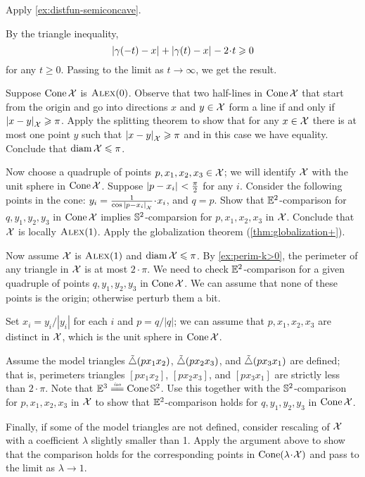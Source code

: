  Apply \ref{ex:distfun-semiconcave}.

 By the triangle inequality, 
\[\dist{\gamma(-t)}{x}{}+\dist{\gamma(t)}{x}{}-2\cdot t\ge 0\]
for any $t\ge 0$.
Passing to the limit as $t\to\infty$, we get the result.

Suppose $\mathop{\rm Cone}\nolimits\mathcal{X}$ is $\textsc{Alex}(0)$.
Observe that two half-lines in $\mathop{\rm Cone}\nolimits\mathcal{X}$ that start from the origin and go into directions $x$ and $y\in\mathcal{X}$ form a line if and only if $|{x}-{y}|_{\mathcal{X}}^{{}}\geqslant \pi$.
Apply the splitting theorem to show that for any $x\in \mathcal{X}$ there is at most one point $y$ such that $|{x}-{y}|_{\mathcal{X}}^{{}}\geqslant \pi$ and in this case we have equality.
Conclude that $\operatorname{\rm diam}\nolimits \mathcal{X}\leqslant \pi$.

Now choose a quadruple of points $p,x_1,x_2,x_3\in \mathcal{X}$;
we will identify $\mathcal{X}$ with the unit sphere in $\mathop{\rm Cone}\nolimits\mathcal{X}$.
Suppose $|{p}-{x_i}|_{}^{{}}<\tfrac\pi2$ for any $i$.
Consider the following points in the cone: $y_i=\tfrac1{\cos \dist{p}{x_i}{\spc{X}}}\cdot x_i$, and $q=p$.
Show that $\mathbb{E}^2$-comparison for $q,y_1,y_2,y_3$ in $\mathop{\rm Cone}\nolimits\mathcal{X}$ implies $\mathbb{S}^2$-comparsion for $p,x_1,x_2,x_3$ in $\mathcal{X}$.
Conclude that $\mathcal{X}$ is locally $\textsc{Alex}(1)$. 
Apply the globalization theorem (\ref{thm:globalization+}).

Now assume $\mathcal{X}$ is $\textsc{Alex}(1)$ and $\operatorname{\rm diam}\nolimits\mathcal{X}\leqslant \pi$.
By \ref{ex:perim-k>0}, the perimeter of any triangle in $\mathcal{X}$ is at most $2\cdot\pi$.
We need to check $\mathbb{E}^2$-comparison for a given quadruple of points $q,y_1,y_2,y_3$ in $\mathop{\rm Cone}\nolimits\mathcal{X}$.
We can assume that none of these points is the origin; otherwise perturb them a bit.

Set $x_i=y_i/|y_i|$ for each $i$ and $p=q/|q|$; we can assume that $p,x_1,x_2,x_3$ are distinct in $\mathcal{X}$, which is the unit sphere in $\mathop{\rm Cone}\nolimits\mathcal{X}$.

Assume the model triangles $\tilde\triangle(px_1x_2)$, $\tilde\triangle(px_2x_3)$, and $\tilde\triangle(px_3x_1)$ are defined;
that is, perimeters triangles $[px_1x_2]$, $[px_2x_3]$, and $[px_3x_1]$ are strictly less than $2\cdot\pi$. 
Note that $\EE^3\iso\Cone\SSS^2$.
Use this together with the $\mathbb{S}^2$-comparison for $p,x_1,x_2,x_3$ in $\mathcal{X}$ to show that $\mathbb{E}^2$-comparison holds for $q,y_1,y_2,y_3$ in $\mathop{\rm Cone}\nolimits\mathcal{X}$.

Finally, if some of the model triangles are not defined, consider rescaling of $\mathcal{X}$ with a coefficient $\lambda$ slightly smaller than 1.
Apply the argument above to show that the comparison holds for the corresponding points in $\Cone(\lambda\cdot\spc{X})$ and pass to the limit as $\lambda\to 1$.

